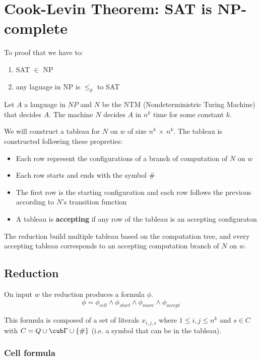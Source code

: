 \documentclass[letterpaper]{article}
\begin{document}
\section{Cook-Levin Theorem: SAT is NP-complete}

To proof that we have to:

\begin{enumerate}
  \item SAT $\in$ NP
  \item any laguage in NP is $\leq_p$ to SAT
\end{enumerate}

Let $A$ a language in $NP$ and $N$
 be the NTM (Nondeterministric Turing Machine)
that decides $A$. The machine $N$ decides $A$ in $n^k$ time for some constant
$k$.

We will construct a tableau for $N$ on $w$ of size $n^k$ $\times$ $n^k$.
The tableau is constructed following these propreties:

\begin{itemize}
  \item Each row represent the configurations
  of a branch of computation of $N$ on $w$
  \item Each row starts and ends with the symbol $\#$
  \item The first row is the starting configuration and each row follows the
  previous according to $N$'s transition function
  \item A tableau is \textbf{accepting} if any row of the tableau
  is an accepting configuraton
\end{itemize}

The reduction build multiple tableau based on the computation tree, and
every accepting tableau corresponds to an accepting computation branch
of $N$ on $w$.

\subsection{Reduction}

On input $w$ the reduction produces a formula $\phi$.
$$
\phi = \phi_{cell} \wedge \phi_{start} \wedge \phi_{move} \wedge \phi_{accept}
$$

This formula is composed of a set of literals $x_{i, j, s}$ where
 $1 \le i, j \le n^k$ and  $s \in C$ with
 $C = Q \cup \cub \Gamma \cup \{\#\}$ (i.e.
 a symbol that can be in the tableau).

\subsubsection{Cell formula}
\end{document}
